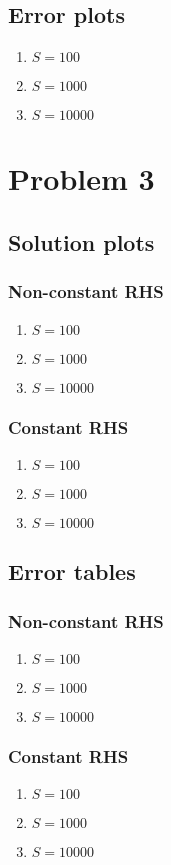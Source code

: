 \documentclass{report}
\begin{document}
\section*{Error plots}
\begin{enumerate}
  \item $S = 100$
  \item $S = 1000$
  \item $S = 10000$
\end{enumerate}

\chapter*{Problem 3}
\section*{Solution plots}
\subsection*{Non-constant RHS}
\begin{enumerate}
  \item $S = 100$
  \item $S = 1000$
  \item $S = 10000$
\end{enumerate}
\subsection*{Constant RHS}
\begin{enumerate}
  \item $S = 100$
  \item $S = 1000$
  \item $S = 10000$
\end{enumerate}
\section*{Error tables}
\subsection*{Non-constant RHS}
\begin{enumerate}
  \item $S = 100$
  \item $S = 1000$
  \item $S = 10000$
\end{enumerate}
\subsection*{Constant RHS}
\begin{enumerate}
  \item $S = 100$
  \item $S = 1000$
  \item $S = 10000$
\end{enumerate}
\end{document}
